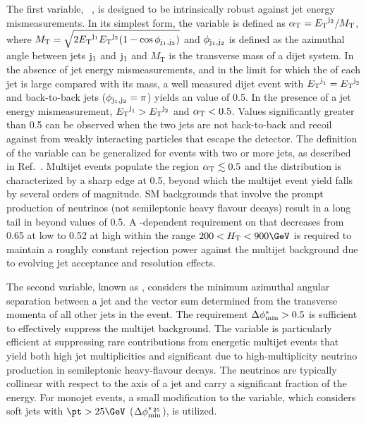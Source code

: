 The first variable, \alphat~\cite{Randall:2008rw, RA1Paper}, is
designed to be intrinsically robust against jet energy
mismeasurements. In its simplest form, the \alphat variable is defined
as $\alpha_{\text{T}} = {E_{\text T}}^{\rm j_2}/M_\text{T}$, where $M_\textrm{T} = \sqrt{
  2 {E_{\text T}}^{\rm j_1} {E_{\text T}}^{\rm j_2} (1 - \cos\phi_{\rm j_1,j_2})}$ and
$\phi_{\rm j_1,j_2}$ is defined as the azimuthal angle between jets
${\rm j_1}$ and ${\rm j_1}$ and $M_\textrm{T}$ is the transverse mass
of a dijet system. In the absence of jet energy mismeasurements, and
in the limit for which the \Et of each jet is large compared with its
mass, a well measured dijet event with ${E_{\text T}}^{\text{j}_\text{1}} =
{E_{\text T}}^{\text{j}_\text{2}}$ and back-to-back jets ($\phi_{\rm j_1,j_2} = \pi$)
yields an \alphat value of 0.5. In the presence of a jet energy
mismeasurement, ${E_{\text T}}^{\text{j}_\text{1}} > {E_{\text T}}^{\text{j}_\text{2}}$ and $\alpha_{\text{T}}
< 0.5$. Values significantly greater than 0.5 can be observed when the
two jets are not back-to-back and recoil against \ptvecmiss from
weakly interacting particles that escape the detector. The definition
of the \alphat variable can be generalized for events with two or more
jets, as described in Ref.~\cite{}. Multijet events populate the
region $\alpha_{\text{T}} \lesssim 0.5$ and the \alphat distribution is
characterized by a sharp edge at 0.5, beyond which the multijet event
yield falls by several orders of magnitude. SM backgrounds that
involve the prompt production of neutrinos (\eg not semileptonic heavy
flavour decays) result in a long tail in \alphat beyond values of
0.5. A \scalht-dependent requirement on \alphat that decreases from
0.65 at low \scalht to 0.52 at high \scalht within the range $200 <
\scalht < 900\GeV$ is required to maintain a roughly constant
rejection power against the multijet background due to evolving jet
acceptance and resolution effects.

The second variable, known as \bdphi, considers the minimum azimuthal
angular separation between a jet and the vector sum determined from
the transverse momenta of all other jets in the event. The requirement
$\Delta\phi^{*}_\text{min} > 0.5$ is sufficient to effectively suppress the multijet
background. The \bdphi variable is particularly efficient at
suppressing rare contributions from energetic multijet events that
yield both high jet multiplicities and significant \met due to
high-multiplicity neutrino production in semileptonic heavy-flavour
decays. The neutrinos are typically collinear with respect to the axis
of a jet and carry a significant fraction of the energy. For monojet
events, a small modification to the \bdphi variable, which considers
soft jets with $\pt > 25\GeV$ ($\Delta\phi^{*_{\, 25}}_\text{min}$), is utilized. 

